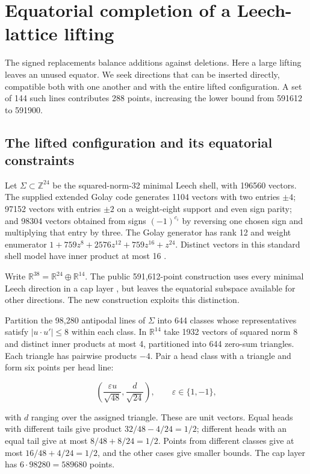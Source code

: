 \section{Equatorial completion of a Leech-lattice lifting}
\label{sec:equatorial}

The signed replacements balance additions against deletions. Here a large
lifting leaves an unused equator. We seek directions that can be inserted
directly, compatible both with one another and with the entire lifted
configuration. A set of 144 such lines contributes 288 points, increasing
the lower bound from 591612 to 591900.

\subsection{The lifted configuration and its equatorial constraints}

Let \(\Sigma\subset\mathbb Z^{24}\) be the squared-norm-32 minimal Leech
shell, with 196560 vectors. The supplied extended Golay code generates
1104 vectors with two entries \(\pm4\); 97152 vectors with entries
\(\pm2\) on a weight-eight support and even sign parity; and 98304
vectors obtained from signs \((-1)^{c_i}\) by reversing one chosen sign
and multiplying that entry by three. The Golay generator has rank 12 and
weight enumerator \(1+759z^8+2576z^{12}+759z^{16}+z^{24}\). Distinct
vectors in this standard shell model have inner product at most 16
\cite{conway1999sphere}.

Write \(\mathbb R^{38}=\mathbb R^{24}\oplus\mathbb R^{14}\). The public
591,612-point construction uses every minimal Leech direction in a cap
layer \cite{kissingnumbers}, but leaves the equatorial subspace
available for other directions. The new construction exploits this
distinction.

Partition the 98,280 antipodal lines of \(\Sigma\) into 644 classes
whose representatives satisfy \(|u\cdot u'|\le8\) within each class. In
\(\mathbb R^{14}\) take 1932 vectors of squared norm 8 and distinct
inner products at most 4, partitioned into 644 zero-sum triangles. Each
triangle has pairwise products \(-4\). Pair a head class with a triangle
and form six points per head line:

\[
\left(\frac{\varepsilon u}{\sqrt{48}},\frac d{\sqrt{24}}\right),
\qquad \varepsilon\in\{1,-1\},
\]

with \(d\) ranging over the assigned triangle. These are unit vectors.
Equal heads with different tails give product \(32/48-4/24=1/2\);
different heads with an equal tail give at most \(8/48+8/24=1/2\).
Points from different classes give at most \(16/48+4/24=1/2\), and the
other cases give smaller bounds. The cap layer has
\(6\cdot98280=589680\) points.

